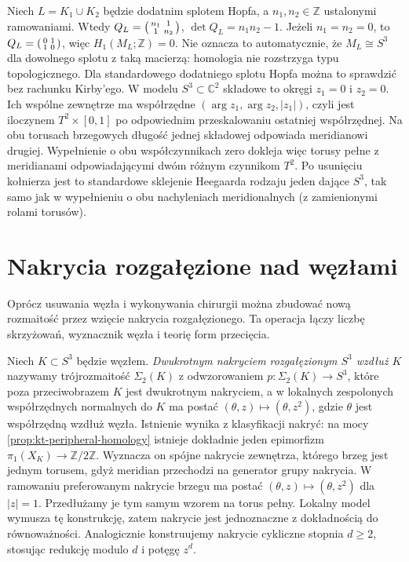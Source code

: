 \begin{przyklad}
Niech $L=K_1\cup K_2$ będzie dodatnim splotem Hopfa,
a $n_1,n_2\in\mathbb Z$ ustalonymi ramowaniami.
Wtedy $Q_L=\begin{psmallmatrix}n_1&1\\1&n_2\end{psmallmatrix}$,
$\det Q_L=n_1n_2-1$. Jeżeli $n_1=n_2=0$, to
$Q_L=\begin{psmallmatrix}0&1\\1&0\end{psmallmatrix}$,
więc $H_1(M_L;\mathbb Z)=0$. Nie oznacza to automatycznie,
że $M_L\cong S^3$ dla dowolnego splotu z taką macierzą:
homologia nie rozstrzyga typu topologicznego. Dla standardowego dodatniego splotu Hopfa można
to sprawdzić bez rachunku Kirby'ego. W modelu
$S^3\subset\mathbb C^2$ składowe to okręgi
$z_1=0$ i $z_2=0$. Ich wspólne zewnętrze
ma współrzędne $(\arg z_1,\arg z_2,|z_1|)$,
czyli jest iloczynem $T^2\times[0,1]$ po
odpowiednim przeskalowaniu ostatniej współrzędnej.
Na obu torusach brzegowych długość jednej
składowej odpowiada meridianowi drugiej.
Wypełnienie o obu współczynnikach zero
dokleja więc torusy pełne z meridianami
odpowiadającymi dwóm różnym czynnikom $T^2$.
Po usunięciu kołnierza jest to standardowe
sklejenie Heegaarda rodzaju jeden dające $S^3$,
tak samo jak w wypełnieniu o obu nachyleniach
meridionalnych (z zamienionymi rolami torusów).
\end{przyklad}

\section{Nakrycia rozgałęzione nad węzłami}
\label{sec:kt-branched}

Oprócz usuwania węzła i wykonywania chirurgii można
zbudować nową rozmaitość przez wzięcie nakrycia
rozgałęzionego. Ta operacja łączy liczbę skrzyżowań,
wyznacznik węzła i teorię form przecięcia.

\begin{definicja}
Niech $K\subset S^3$ będzie węzłem. \emph{Dwukrotnym
nakryciem rozgałęzionym $S^3$ wzdłuż $K$} nazywamy
trójrozmaitość $\Sigma_2(K)$ z odwzorowaniem
$p\colon\Sigma_2(K)\to S^3$, które poza przeciwobrazem
$K$ jest dwukrotnym nakryciem, a w lokalnych zespolonych
współrzędnych normalnych do $K$ ma postać
$(\theta,z)\mapsto(\theta,z^2)$,
gdzie $\theta$ jest współrzędną wzdłuż węzła.
Istnienie wynika z klasyfikacji nakryć: na mocy
\ref{prop:kt-peripheral-homology} istnieje dokładnie
jeden epimorfizm $\pi_1(X_K)\to\mathbb Z/2\mathbb Z$.
Wyznacza on spójne nakrycie zewnętrza, którego brzeg
jest jednym torusem, gdyż meridian przechodzi na
generator grupy nakrycia. W ramowaniu preferowanym
nakrycie brzegu ma postać $(\theta,z)\mapsto
(\theta,z^2)$ dla $|z|=1$. Przedłużamy je tym samym
wzorem na torus pełny. Lokalny model wymusza tę
konstrukcję, zatem nakrycie jest jednoznaczne
z dokładnością do równoważności. Analogicznie
konstruujemy nakrycie cykliczne stopnia $d\ge2$,
stosując redukcję modulo $d$ i potęgę $z^d$.
\end{definicja}

